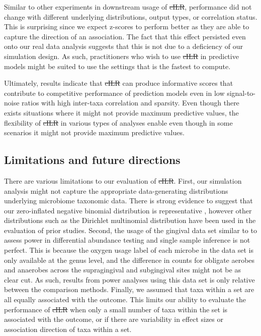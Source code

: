 \documentclass[10pt,letterpaper]{article}
\providecommand{\DIFaddtex}[1]{{\protect\color{blue}\uwave{#1}}} %
\providecommand{\DIFdeltex}[1]{{\protect\color{red}\sout{#1}}}                      %
\providecommand{\DIFaddbegin}{} %
\providecommand{\DIFaddend}{} %
\providecommand{\DIFdelbegin}{} %
\providecommand{\DIFdelend}{} %
\providecommand{\DIFadd}[1]{\texorpdfstring{\DIFaddtex{#1}}{#1}} %
\providecommand{\DIFdel}[1]{\texorpdfstring{\DIFdeltex{#1}}{}} %
\newcommand{\DIFscaledelfig}{0.5}
\newlength{\DIFdelgraphicswidth} %
\newlength{\DIFdelgraphicsheight} %
\newcommand{\DIFaddincludegraphics}[2][]{{\color{blue}\fbox{\DIFOincludegraphics[#1]{#2}}}} %
\newcommand{\DIFdelincludegraphics}[2][]{%
\sbox{\DIFdelgraphicsbox}{\DIFOincludegraphics[#1]{#2}}%
\settoboxwidth{\DIFdelgraphicswidth}{\DIFdelgraphicsbox} %
\settoboxtotalheight{\DIFdelgraphicsheight}{\DIFdelgraphicsbox} %
\scalebox{\DIFscaledelfig}{%
\parbox[b]{\DIFdelgraphicswidth}{\usebox{\DIFdelgraphicsbox}\\[-\baselineskip] \rule{\DIFdelgraphicswidth}{0em}}\llap{\resizebox{\DIFdelgraphicswidth}{\DIFdelgraphicsheight}{%
\setlength{\unitlength}{\DIFdelgraphicswidth}%
\begin{picture}(1,1)%
\thicklines\linethickness{2pt} %
{\color[rgb]{1,0,0}\put(0,0){\framebox(1,1){}}}%
{\color[rgb]{1,0,0}\put(0,0){\line( 1,1){1}}}%
{\color[rgb]{1,0,0}\put(0,1){\line(1,-1){1}}}%
\end{picture}%
}\hspace*{3pt}}} %
} %
\DeclareRobustCommand{\DIFaddbegin}{\DIFOaddbegin \let\includegraphics\DIFaddincludegraphics} %
\DeclareRobustCommand{\DIFaddend}{\DIFOaddend \let\includegraphics\DIFOincludegraphics} %
\DeclareRobustCommand{\DIFdelbegin}{\DIFOdelbegin \let\includegraphics\DIFdelincludegraphics} %
\DeclareRobustCommand{\DIFdelend}{\DIFOaddend \let\includegraphics\DIFOincludegraphics} %
\begin{document}
Similar to other experiments in downstream usage of \DIFdelbegin \DIFdel{cILR}\DIFdelend \DIFaddbegin \DIFadd{CBEA}\DIFaddend , performance did not change with different underlying distributions, output types, or correlation status. This is surprising since we expect z-scores to perform better as they are able to capture the direction of an association. The fact that this effect persisted even onto our real data analysis suggests that this is not due to a deficiency of our simulation design. As such, practitioners who wish to use \DIFdelbegin \DIFdel{cILR }\DIFdelend \DIFaddbegin \DIFadd{CBEA }\DIFaddend in predictive models might be suited to use the settings that is the fastest to compute.  

Ultimately, results indicate that \DIFdelbegin \DIFdel{cILR }\DIFdelend \DIFaddbegin \DIFadd{CBEA }\DIFaddend can produce informative scores that contribute to competitive performance of prediction models even in low signal-to-noise ratios with high inter-taxa correlation and sparsity. Even though there exists situations where it might not provide maximum predictive values, the flexibility of \DIFdelbegin \DIFdel{cILR }\DIFdelend \DIFaddbegin \DIFadd{CBEA }\DIFaddend in various types of analyses enable even though in some scenarios it might not provide maximum predictive values. 

\subsection*{Limitations and future directions} 
There are various limitations to our evaluation of \DIFdelbegin \DIFdel{cILR}\DIFdelend \DIFaddbegin \DIFadd{CBEA}\DIFaddend . First, our simulation analysis might not capture the appropriate data-generating distributions underlying microbiome taxonomic data. There is strong evidence to suggest that our zero-inflated negative binomial distribution is representative \cite{calgaro2020}, however other distributions such as the Dirichlet multinomial distribution \cite{wu2016} have been used in the evaluation of prior studies. Second, the usage of the gingival data set similar to \cite{calgaro2020} to assess power in differential abundance testing and single sample inference is not perfect. This is because the oxygen usage label of each microbe in the data set is only available at the genus level, and the difference in counts for obligate aerobes and anaerobes across the supragingival and subgingival sites might not be as clear cut. As such, results from power analyses using this data set is only relative between the comparison methods. Finally, we assumed that taxa within a set are all equally associated with the outcome. This limits our ability to evaluate the performance of \DIFdelbegin \DIFdel{cILR }\DIFdelend \DIFaddbegin \DIFadd{CBEA }\DIFaddend when only a small number of taxa within the set is associated with the outcome, or if there are variability in effect sizes or association direction of taxa within a set. 
\end{document}
